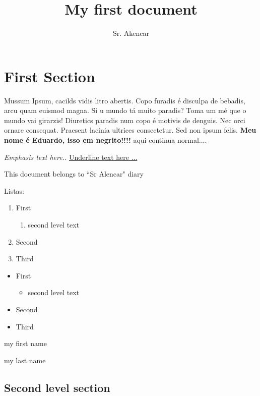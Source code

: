 \documentclass{article}
\title{My first document}
\author{Sr. Akencar}
\date{}
\begin{document}
\maketitle

\section{First Section}

Mussum Ipsum, cacilds vidis litro abertis. Copo furadis é disculpa de bebadis, arcu quam euismod magna. Si u mundo tá muito paradis? Toma um mé que o mundo vai girarzis! Diuretics paradis num copo é motivis de denguis. Nec orci ornare consequat. Praesent lacinia ultrices consectetur. Sed non ipsum felis. \textbf{Meu nome é Eduardo, isso em negrito!!!!} aqui continua normal....

\emph{Emphasis text here..} \underline {Underline text here ...}

This document belongs to ``Sr Alencar" diary

Listas:

\begin{enumerate}
\item First
\begin{enumerate}
\item{second level text}
\end{enumerate}

\item Second
\item Third

\end{enumerate}

\begin{itemize}
\item First
\begin{itemize}
\item{second level text}
\end{itemize}

\item Second
\item Third

\end{itemize}

\begin{description}[noitemsep]
\item [Eduardo] my first name
\item [Alencar] my last name
\end{description}




\subsection{Second level section}
\end{document}
